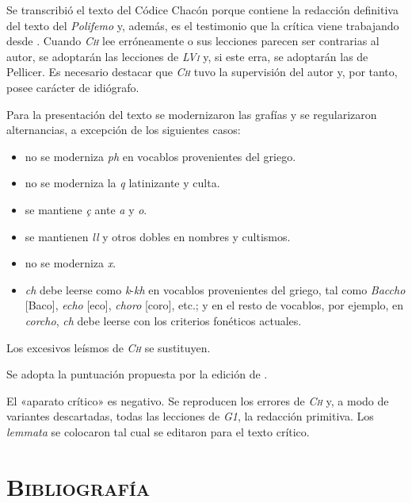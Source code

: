 \documentclass[11pt,a4paper,twoside]{article}
\newcommand{\comillas}[1]{«#1»}
\newcommand{\ch}{\emph{\textsc{Ch}}}
\newcommand{\guno}{\emph{G1}}
\newcommand{\lvi}{\emph{\textsc{LVi}}}
\begin{document}
Se transcribió el texto del Códice Chacón porque contiene la redacción definitiva del texto del \emph{Polifemo} y, además, es el testimonio que la crítica viene trabajando desde \textcite{Fouché-Delbosc1900}. Cuando {\ch} lee erróneamente o sus lecciones parecen ser contrarias al autor, se adoptarán las lecciones de {\lvi} y, si este erra, se adoptarán las de Pellicer. Es necesario destacar que {\ch} tuvo la supervisión del autor y, por tanto, posee carácter de idiógrafo.\par
%
Para la presentación del texto se modernizaron las grafías y se regularizaron alternancias, a excepción de los siguientes casos: 
%
\begin{itemize}[label=--]%
\item no se moderniza \emph{ph} en vocablos provenientes del griego.
\item no se moderniza la \emph{q} latinizante y culta.
\item se mantiene \emph{ç} ante \emph{a} y \emph{o}. 
\item se mantienen \emph{ll} y otros dobles en nombres y cultismos.
\item no se moderniza \emph{x}.
\item \emph{ch} debe leerse como \emph{k}-\emph{kh} en vocablos provenientes del griego, tal como \emph{Baccho} [Baco], \emph{echo} [eco], \emph{choro} [coro], etc.; y en el resto de vocablos, por ejemplo, en \emph{corcho}, \emph{ch} debe leerse con los criterios fonéticos actuales.
\end{itemize}\par
%
Los excesivos leísmos de {\ch} se sustituyen.\par
%
Se adopta la puntuación propuesta por la edición de \textcite{Alonso1967}.\par
%
El \comillas{aparato crítico} es negativo. Se reproducen los errores de {\ch} y, a modo de variantes descartadas, todas las lecciones de {\guno}, la redacción primitiva. Los \emph{lemmata} se colocaron tal cual se editaron para el texto crítico.\par

\section*{\centering \textsc{Bibliografía}}
\nocite{*}
\printbibliography[heading=none]
\newpage
\end{document}
